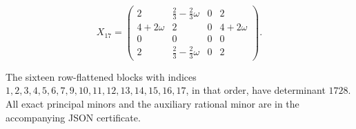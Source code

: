 \[ X_{17}=\begin{pmatrix}
2 & \frac{2}{3}-\frac{2}{3}\omega & 0 & 2 \\
4+2\omega & 2 & 0 & 4+2\omega \\
0 & 0 & 0 & 0 \\
2 & \frac{2}{3}-\frac{2}{3}\omega & 0 & 2
\end{pmatrix}.\]

The sixteen row-flattened blocks with indices $1,2,3,4,5,6,7,9,10,11,12,13,14,15,16,17$, in that order, have determinant $1728$. All exact principal minors and the auxiliary rational minor are in the accompanying JSON certificate.
